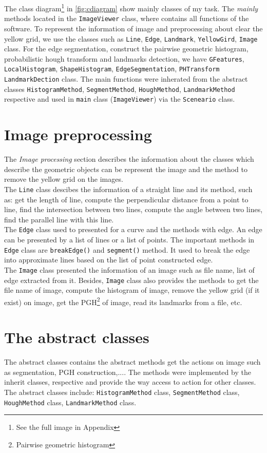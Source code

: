 The class diagram\footnote{See the full image in Appendix} in \ref{fig:cdiagram} show mainly classes of my task. The \textit{mainly} methods located in the \texttt{ImageViewer} class, where contains all functions of the software. To represent the information of image and preprocessing about clear the yellow grid, we use the classes such as \texttt{Line}, \texttt{Edge}, \texttt{Landmark}, \texttt{YellowGird}, \texttt{Image} class. For the edge segmentation, construct the pairwise geometric histogram, probabilistic hough transform and landmarks detection, we have \texttt{GFeatures}, \texttt{LocalHistogram}, \texttt{ShapeHistogram}, \texttt{EdgeSegmentation}, \texttt{PHTransform} \texttt{LandmarkDection} class. The main functions were inherated from the abstract classes \texttt{HistogramMethod}, \texttt{SegmentMethod}, \texttt{HoughMethod}, \texttt{LandmarkMethod} respective and used in \texttt{main} class (\texttt{ImageViewer}) via the \texttt{Sceneario} class. 
\section{Image preprocessing}
The \textit{Image processing} section describes the information about the classes which describe the geometric objects can be represent the image and the method to remove the yellow grid on the images.\\[0.2cm]
The \texttt{Line} class descibes the information of a straight line and its method, such as: get the length of line, compute the perpendicular distance from a point to line, find the intersection between two lines, compute the angle between two lines, find the parallel line with this line.\\[0.2cm]
The \texttt{Edge} class used to presented for a curve and the methods with edge. An edge can be presented by a list of lines or a list of points. The important methods in \texttt{Edge} class are \texttt{breakEdge()} and \texttt{segment()} method. It used to break the edge into approximate lines based on the list of point constructed edge.\\[0.2cm]
The \texttt{Image} class presented the information of an image such as file name, list of edge extracted from it. Besides, \texttt{Image} class also provides the methods to get the file name of image, compute the histogram of image, remove the yellow grid (if it exist) on image, get the PGH\footnote{Pairwise geometric histogram} of image, read its landmarks from a file, etc. \\[0.2cm]
\section{The abstract classes}
The abstract classes contains the abstract methods get the actions on image such as segmentation, PGH construction,.... The methods were implemented by the inherit classes, respective and provide the way access to action for other classes. The abstract classes include: \texttt{HistogramMethod} class, \texttt{SegmentMethod} class, \texttt{HoughMethod} class, \texttt{LandmarkMethod} class.
